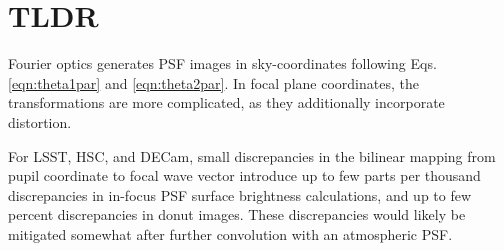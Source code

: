 \documentclass{article}
\begin{document}
\section{TLDR}

Fourier optics generates PSF images in sky-coordinates following Eqs. \ref{eqn:theta1par} and
\ref{eqn:theta2par}.  In focal plane coordinates, the transformations are more complicated, as they
additionally incorporate distortion.

For LSST, HSC, and DECam, small discrepancies in the bilinear mapping from pupil coordinate 
to focal wave vector  introduce up to few parts per thousand discrepancies in in-focus PSF
surface brightness calculations, and up to few percent discrepancies in donut images.  These
discrepancies would likely be mitigated somewhat after further convolution with an atmospheric PSF.
\end{document}
